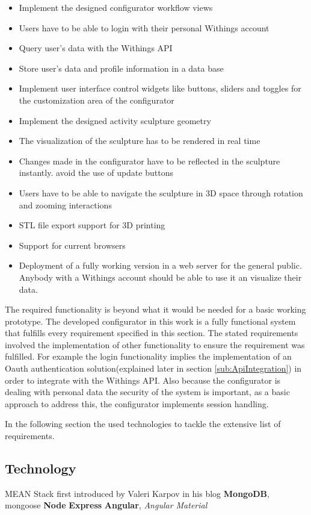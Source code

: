 \documentclass[../medieninformatik-arbeit.tex]{subfiles}
\begin{document}
\begin{itemize}
	\item Implement the designed configurator workflow views
	\item Users have to be able to login with their personal Withings account
	\item Query user's data with the Withings API
	\item Store user's data and profile information in a data base
	\item Implement user interface control widgets like buttons, sliders and toggles for the customization area of the configurator
	\item Implement the designed activity sculpture geometry
	\item The visualization of the sculpture has to be rendered in real time  
	\item Changes made in the configurator have to be reflected in the sculpture instantly. avoid the use of update buttons 
	\item Users have to be able to navigate the sculpture in 3D space through rotation and zooming interactions
	\item STL file export support for 3D printing
	\item Support for current browsers
	\item Deployment of a fully working version in a web server for the general public. Anybody with a Withings account should be able to use it an visualize their data.
\end{itemize}


The required functionality is beyond what it would be needed for a basic working prototype. The developed configurator in this work is a fully functional system that fulfills every requirement specified in this section. The stated requirements involved the implementation of other functionality to ensure the requirement was fulfilled. For example the login functionality implies the implementation of an Oauth authentication solution(explained later in section \ref{sub:ApiIntegration}) in order to integrate with the Withings API. Also because the configurator is dealing with personal data the security of the system is important, as a basic approach to address this, the configurator implements session handling.

In the following section the used technologies to tackle the extensive list of requirements.  

\subsection{Technology}
MEAN Stack first introduced by Valeri Karpov in his blog\cite{meanstack}
\textbf{MongoDB}\cite{mongodb}, mongoose\cite{mongoose}
\textbf{Node}\cite{joyent2015node}  
\textbf{Express}\cite{express} 
\textbf{Angular}\cite{angular}, 
\textit{Angular Material}\cite{angularmaterial}
\end{document}
